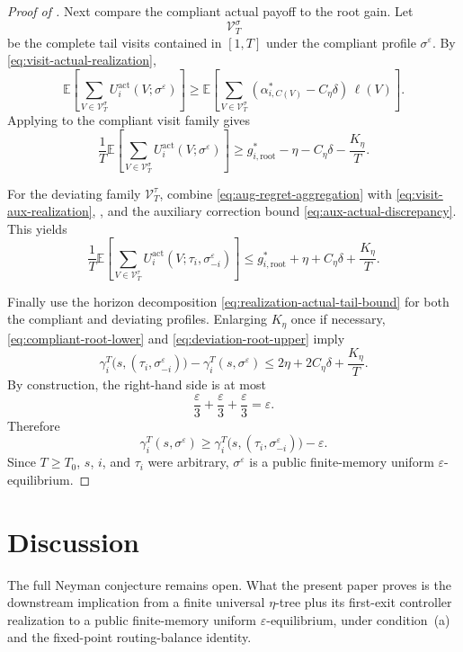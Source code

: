 \documentclass[12pt]{article}
\theoremstyle{definition}
\newcommand{\eps}{\varepsilon}
\newcommand{\E}{\mathbb{E}}
\newcommand{\1}{\mathbf{1}}
\begin{document}
\begin{proof}[Proof of ]
Next compare the compliant actual payoff to the root gain. Let
\[
\mathcal V_T^{\sigma}
\]
be the complete tail visits contained in $[1,T]$ under the compliant profile
$\sigma^\eps$. By \eqref{eq:visit-actual-realization},
\[
\E\left[
\sum_{V\in\mathcal V_T^{\sigma}}
U_i^{\mathrm{act}}(V;\sigma^\eps)
\right]
\ge
\E\left[
\sum_{V\in\mathcal V_T^{\sigma}}
(\alpha_{i,C(V)}^*-C_\eta\delta)\,\ell(V)
\right].
\]
Applying  to the compliant visit family gives
\begin{equation}
\label{eq:compliant-root-lower}
\frac1T\E\left[
\sum_{V\in\mathcal V_T^{\sigma}}
U_i^{\mathrm{act}}(V;\sigma^\eps)
\right]
\ge
g_{i,\mathrm{root}}^* - \eta - C_\eta\delta - \frac{K_\eta}{T}.
\end{equation}

For the deviating family $\mathcal V_T^{\tau}$, combine
\eqref{eq:aug-regret-aggregation} with
\eqref{eq:visit-aux-realization}, , and the auxiliary
correction bound \eqref{eq:aux-actual-discrepancy}. This yields
\begin{equation}
\label{eq:deviation-root-upper}
\frac1T\E\left[
\sum_{V\in\mathcal V_T^{\tau}}
U_i^{\mathrm{act}}(V;\tau_i,\sigma^\eps_{-i})
\right]
\le
g_{i,\mathrm{root}}^* + \eta + C_\eta\delta + \frac{K_\eta}{T}.
\end{equation}

Finally use the horizon decomposition \eqref{eq:realization-actual-tail-bound}
for both the compliant and deviating profiles. Enlarging $K_\eta$ once if
necessary, \eqref{eq:compliant-root-lower} and \eqref{eq:deviation-root-upper}
imply
\[
\gamma_i^T\bigl(s,(\tau_i,\sigma^\eps_{-i})\bigr)
-
\gamma_i^T(s,\sigma^\eps)
\le
2\eta + 2C_\eta\delta + \frac{K_\eta}{T}.
\]
By construction, the right-hand side is at most
\[
\frac{\eps}{3}+\frac{\eps}{3}+\frac{\eps}{3}=\eps.
\]
Therefore
\[
\gamma_i^T(s,\sigma^\eps)
\ge
\gamma_i^T\bigl(s,(\tau_i,\sigma^\eps_{-i})\bigr)-\eps.
\]
Since $T\ge T_0$, $s$, $i$, and $\tau_i$ were arbitrary, $\sigma^\eps$ is a
public finite-memory uniform $\eps$-equilibrium.
\end{proof}


\section{Discussion}

The full Neyman conjecture remains open. What the present paper proves is the
downstream implication from a finite universal $\eta$-tree plus its first-exit
controller realization to a public finite-memory uniform $\eps$-equilibrium,
under condition~\textnormal{(a)} and the fixed-point routing-balance identity.
\end{document}
